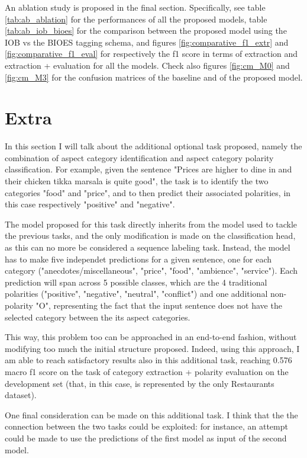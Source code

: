 \documentclass[11pt,a4paper]{article}
\begin{document}
	An ablation study is proposed in the final section. Specifically, see table
	\ref{tab:ab_ablation} for the performances of all the proposed models,
	table \ref{tab:ab_iob_bioes} for the comparison between the proposed model using the
	IOB vs the BIOES tagging schema, and figures \ref{fig:comparative_f1_extr} and
	\ref{fig:comparative_f1_eval} for respectively the f1 score in terms
	of extraction and extraction + evaluation for all the models. Check also figures \ref{fig:cm_M0} and \ref{fig:cm_M3} for the confusion matrices of the baseline and of the proposed model.
	
	\section{Extra}
	In this section I will talk about the additional optional task proposed, namely the combination of aspect category identification and aspect category polarity classification. For example, given the sentence "Prices are higher to dine in and their chicken tikka marsala is quite good", the task is to identify the two categories "food" and "price", and to then predict their associated polarities, in this case respectively "positive" and "negative".
	
	The model proposed for this task directly inherits from the model used to tackle the previous tasks, and the only modification is made on the classification head, as this can no more be considered a sequence labeling task. Instead, the model has to make five independet predictions for a given sentence, one for each category ("anecdotes/miscellaneous", "price", "food", "ambience", "service"). Each prediction will span across 5 possible classes, which are the 4 traditional polarities ("positive", "negative", "neutral", "conflict") and one additional non-polarity "O", representing the fact that the input sentence does not have the selected category between the its aspect categories.
	
	This way, this problem too can be approached in an end-to-end fashion, without modifying too much the initial structure proposed. Indeed, using this approach, I am able to reach satisfactory results also in this additional task, reaching 0.576 macro f1 score on the task of category extraction + polarity evaluation on the development set (that, in this case, is represented by the only Restaurants dataset).
	
	One final consideration can be made on this additional task. I think that the the connection between the two tasks could be exploited: for instance, an attempt could be made to use the predictions of the first model as input of the second model.
	
\end{document}
